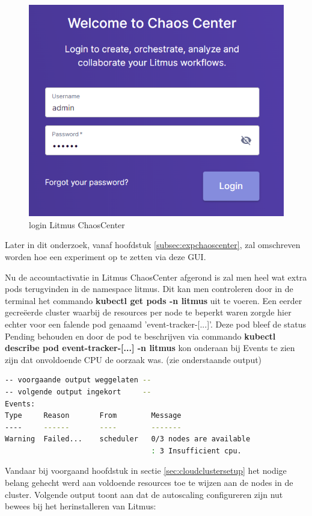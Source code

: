 \begin{figure}[h]
    \centering
    \includegraphics[scale=.5]{img/chaoscenter-login.png}
    \caption{login Litmus ChaosCenter}
\end{figure}

Later in dit onderzoek, vanaf hoofdstuk \ref{subsec:expchaoscenter}, zal omschreven worden hoe een experiment op te zetten via deze GUI. 
 
Nu de accountactivatie in Litmus ChaosCenter afgerond is zal men heel wat extra pods terugvinden in de namespace litmus. Dit kan men controleren door in de terminal het commando {\bf kubectl get pods -n litmus} uit te voeren. Een eerder gecreëerde cluster waarbij de resources per node te beperkt waren zorgde hier echter voor een falende pod genaamd 'event-tracker-[...]'. Deze pod bleef de status Pending behouden en door de pod te beschrijven via commando {\bf kubectl describe pod event-tracker-[...] -n litmus} kon onderaan bij Events te zien zijn dat onvoldoende CPU de oorzaak was. (zie onderstaande output)
 
\begin{lstlisting}[language=bash]
-- voorgaande output weggelaten --
-- volgende output ingekort     --
Events:
Type     Reason       From        Message
----     ------       ----        -------
Warning  Failed...    scheduler   0/3 nodes are available
                                  : 3 Insufficient cpu.
\end{lstlisting}
 
Vandaar bij voorgaand hoofdstuk in sectie \ref {sec:cloudclustersetup} het nodige belang gehecht werd aan voldoende resources toe te wijzen aan de nodes in de cluster. Volgende output toont aan dat de autoscaling configureren zijn nut bewees bij het herinstalleren van Litmus: 

